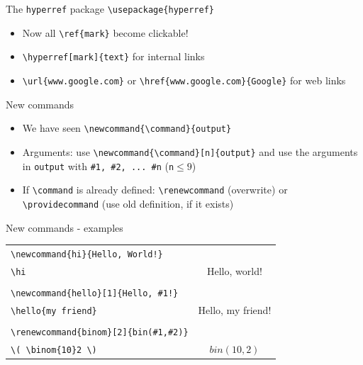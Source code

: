 \documentclass[11pt]{beamer}
\newcommand{\bs}{\textbackslash}
\begin{document}
\begin{frame}{The \texttt{hyperref} package}
  \texttt{\bs usepackage\{hyperref\}}

  \vspace{1cm}
  \begin{itemize}
    \item Now all \texttt{\bs ref\{mark\}} become clickable!

    \vspace{0.3cm}
    \item \texttt{\bs hyperref[mark]\{text\}} for internal links

    \vspace{0.3cm}
    \item \texttt{\bs url\{www.google.com\}} or
          \texttt{\bs href\{www.google.com\}\{Google\}} for web links
  \end{itemize}
\end{frame}

\begin{frame}{New commands}
  \begin{itemize}
    \item We have seen \texttt{\bs newcommand\{\bs command\}\{output\}}

    \vspace{0.3cm}
    \item Arguments: use \texttt{\bs newcommand\{\bs command\}[n]\{output\}}
          and use the arguments in \texttt{output} with
          \texttt{\#1, \#2, ... \#n} \hspace{0.4cm}(\texttt n$\leq 9$)

    \vspace{0.3cm}
    \item If \texttt{\bs command} is already defined:
          \texttt{\bs renewcommand} (overwrite) or
          \texttt{\bs providecommand} (use old definition, if it exists)
  \end{itemize}
\end{frame}

\begin{frame}{New commands - examples}
  
  \begin{tabular}{l|c}
    \texttt{\bs newcommand\{hi\}\{Hello, World!\}} \\
    \texttt{\bs hi} & Hello, world! \\
    \\
    \texttt{\bs newcommand\{hello\}[1]\{Hello, \#1!\}} \\
    \texttt{\bs hello\{my friend\}} & Hello, my friend! \\
    \\
    \texttt{\bs renewcommand\{binom\}[2]\{bin(\#1,\#2)\}} \\
    \texttt{\bs( \bs binom\{10\}2 \bs)} & \(bin(10,2)\)
  \end{tabular}
\end{frame}
\end{document}

